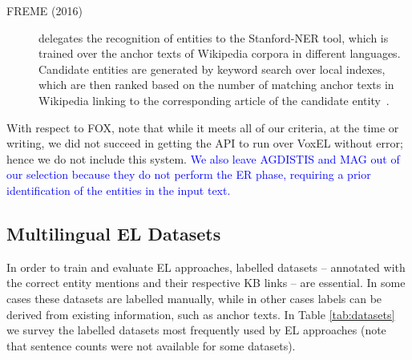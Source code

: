 \documentclass{llncs}
\begin{document}
\begin{description}
\item[FREME (2016)] delegates the recognition of entities to the Stanford-NER tool, which is trained over the anchor texts of Wikipedia corpora in different languages. Candidate entities are generated by keyword search over local indexes, which are then ranked based on the number of matching anchor texts in Wikipedia linking to the corresponding article of the candidate entity~\cite{freme-ner2016}.
\end{description}

With respect to FOX, note that while it meets all of our criteria, at the time or writing, we did not succeed in getting the API to run over VoxEL without error; hence we do not include this system. \textcolor{blue}{We also leave AGDISTIS and MAG out of our selection because they do not perform the ER phase, requiring a prior identification of the entities in the input text.}




\subsection{Multilingual EL Datasets}

In order to train and evaluate EL approaches, labelled datasets -- annotated with the correct entity mentions and their respective KB links -- are essential. In some cases these datasets are labelled manually, while in other cases labels can be derived from existing information, such as anchor texts. In Table \ref{tab:datasets} we survey the labelled datasets most frequently used by EL approaches (note that sentence counts were not available for some datasets).
\end{document}
